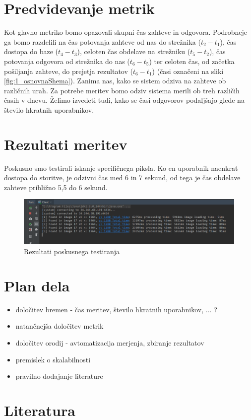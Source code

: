 \section{Predvidevanje metrik}

Kot glavno metriko bomo opazovali skupni čas zahteve in odgovora.
Podrobneje ga bomo razdelili na čas potovanja zahteve od nas do strežnika ($t_2 - t_1$), čas dostopa do baze ($t_4 - t_3$), celoten čas obdelave na strežniku ($t_5 - t_2$), čas potovanja odgovora od strežnika do nas ($t_6 - t_5$) ter celoten čas, od začetka pošiljanja zahteve, do prejetja rezultatov ($t_6 - t_1$) (časi označeni na sliki \ref{fig:1_osnovnaShema}).
Zanima nas, kako se sistem odziva na zahteve ob različnih urah. Za potrebe meritev bomo odziv sistema merili ob treh različih časih v dnevu. Želimo izvedeti tudi, kako se časi odgovorov podaljšajo glede na število hkratnih uporabnikov.

\section{Rezultati meritev} %

Poskusno smo testirali iskanje specifičnega piksla.
Ko en uporabnik naenkrat dostopa do storitve, je odzivni čas med 6 in 7 sekund, od tega je čas obdelave zahteve približno 5,5 do 6 sekund.

\begin{figure}[H]
    \centering
    \includegraphics[scale=0.3]{Img/1_preliminary_test.png}
    \caption{Rezultati poskusnega testiranja}
    \label{fig:1_preliminary_test}
\end{figure}

\section{Plan dela}

\begin{itemize}
\item določitev bremen - čas meritev, število hkratnih uporabnikov, ... ?
\item natančnejša določitev metrik 
\item določitev orodij - avtomatizacija merjenja, zbiranje rezultatov
\item premislek o skalabilnosti
\item pravilno dodajanje literature
\end{itemize}

\section{Literatura}




